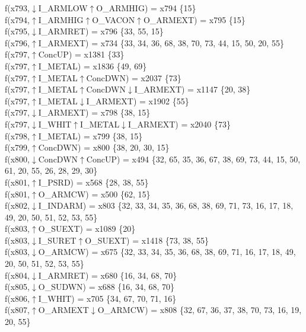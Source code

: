f(x793,$\downarrow$I\_ARMLOW$\uparrow$O\_ARMHIG) = x794 \{15\} \\  
f(x794,$\uparrow$I\_ARMHIG$\uparrow$O\_VACON$\uparrow$O\_ARMEXT) = x795 \{15\} \\  
f(x795,$\downarrow$I\_ARMRET) = x796 \{33, 55, 15\} \\  
f(x796,$\uparrow$I\_ARMEXT) = x734 \{33, 34, 36, 68, 38, 70, 73, 44, 15, 50, 20, 55\} \\  
f(x797,$\uparrow$ConcUP) = x1381 \{33\} \\  
f(x797,$\uparrow$I\_METAL) = x1836 \{49, 69\} \\  
f(x797,$\uparrow$I\_METAL$\uparrow$ConcDWN) = x2037 \{73\} \\  
f(x797,$\uparrow$I\_METAL$\uparrow$ConcDWN$\downarrow$I\_ARMEXT) = x1147 \{20, 38\} \\  
f(x797,$\uparrow$I\_METAL$\downarrow$I\_ARMEXT) = x1902 \{55\} \\  
f(x797,$\downarrow$I\_ARMEXT) = x798 \{38, 15\} \\  
f(x797,$\downarrow$I\_WHIT$\uparrow$I\_METAL$\downarrow$I\_ARMEXT) = x2040 \{73\} \\  
f(x798,$\uparrow$I\_METAL) = x799 \{38, 15\} \\  
f(x799,$\uparrow$ConcDWN) = x800 \{38, 20, 30, 15\} \\  
f(x800,$\downarrow$ConcDWN$\uparrow$ConcUP) = x494 \{32, 65, 35, 36, 67, 38, 69, 73, 44, 15, 50, 61, 20, 55, 26, 28, 29, 30\} \\  
f(x801,$\uparrow$I\_PSRD) = x568 \{28, 38, 55\} \\  
f(x801,$\uparrow$O\_ARMCW) = x500 \{62, 15\} \\  
f(x802,$\downarrow$I\_INDARM) = x803 \{32, 33, 34, 35, 36, 68, 38, 69, 71, 73, 16, 17, 18, 49, 20, 50, 51, 52, 53, 55\} \\  
f(x803,$\uparrow$O\_SUEXT) = x1089 \{20\} \\  
f(x803,$\downarrow$I\_SURET$\uparrow$O\_SUEXT) = x1418 \{73, 38, 55\} \\  
f(x803,$\downarrow$O\_ARMCW) = x675 \{32, 33, 34, 35, 36, 68, 38, 69, 71, 16, 17, 18, 49, 20, 50, 51, 52, 53, 55\} \\  
f(x804,$\downarrow$I\_ARMRET) = x680 \{16, 34, 68, 70\} \\  
f(x805,$\downarrow$O\_SUDWN) = x688 \{16, 34, 68, 70\} \\  
f(x806,$\uparrow$I\_WHIT) = x705 \{34, 67, 70, 71, 16\} \\  
f(x807,$\uparrow$O\_ARMEXT$\downarrow$O\_ARMCW) = x808 \{32, 67, 36, 37, 38, 70, 73, 16, 19, 20, 55\} \\  

